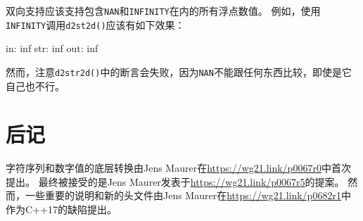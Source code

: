 双向支持应该支持包含\texttt{NAN}和\texttt{INFINITY}在内的所有浮点数值。
例如，使用\texttt{INFINITY}调用\texttt{d2st2d()}应该有如下效果：
\begin{blacklisting}
    in:  inf
    str: inf
    out: inf
\end{blacklisting}
然而，注意\texttt{d2str2d()}中的断言会失败，因为\texttt{NAN}不能跟任何东西比较，即使是它自己也不行。

\section{后记}
字符序列和数字值的底层转换由Jens Maurer在\url{https://wg21.link/p0067r0}中首次提出。
最终被接受的是Jens Maurer发表于\url{https://wg21.link/p0067r5}的提案。
然而，一些重要的说明和新的头文件由Jens Maurer在\url{https://wg21.link/p0682r1}中
作为C++17的缺陷提出。
